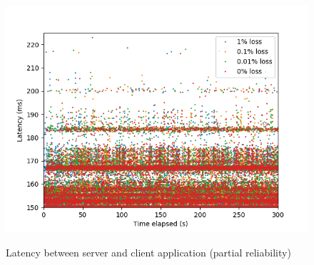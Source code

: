 \documentclass{mpaper}
\begin{document}
\begin{figure}
{   \includegraphics[scale=0.5]{images/graphics-partial/150ms-app-latencies-combined-PARTIAL.png}
   \label{app-par-150}
 }
 \caption{Latency between server and client application (partial reliability)}
 \label{app-par}
\end{figure}
\end{document}
